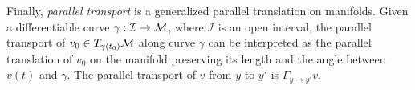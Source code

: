 %
Finally, \textit{parallel transport} is a generalized parallel translation on manifolds. Given a differentiable curve $\gamma : \mathcal{I} \rightarrow  \mathcal{M}$, where $\mathcal{I}$ is an open interval, 
the parallel transport of $v_0 \in T_{\gamma(t_0)}\mathcal{M}$ along curve $\gamma$ can be interpreted as the parallel translation of $v_0$ on the manifold preserving its length and the angle between $v (t)$ and $\gamma$. 
The parallel transport of $v$ from $y$ to $y'$ is $\Gamma_{y\rightarrow y'}v$.
